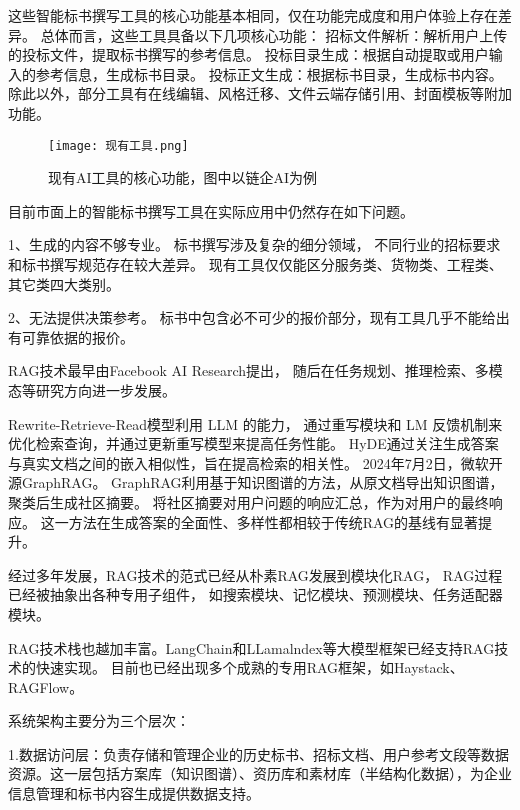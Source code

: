 \documentclass{xmu}
\begin{document}
这些智能标书撰写工具的核心功能基本相同，仅在功能完成度和用户体验上存在差异。
总体而言，这些工具具备以下几项核心功能：
招标文件解析：解析用户上传的投标文件，提取标书撰写的参考信息。
投标目录生成：根据自动提取或用户输入的参考信息，生成标书目录。
投标正文生成：根据标书目录，生成标书内容。
除此以外，部分工具有在线编辑、风格迁移、文件云端存储引用、封面模板等附加功能。

\begin{figure}[!htb]
    \centering
    \texttt{[image: 现有工具.png]}\\
    \caption{现有AI工具的核心功能，图中以链企AI为例}\label{xmulogo}
\end{figure}

目前市面上的智能标书撰写工具在实际应用中仍然存在如下问题。

1、生成的内容不够专业。
标书撰写涉及复杂的细分领域，
不同行业的招标要求和标书撰写规范存在较大差异。
现有工具仅仅能区分服务类、货物类、工程类、其它类四大类别。

2、无法提供决策参考。
标书中包含必不可少的报价部分，现有工具几乎不能给出有可靠依据的报价。

RAG技术最早由Facebook AI Research提出，
随后在任务规划、推理检索、多模态等研究方向进一步发展。

Rewrite-Retrieve-Read模型利用 LLM 的能力，
通过重写模块和 LM 反馈机制来优化检索查询，并通过更新重写模型来提高任务性能\cite{RRR}。
HyDE通过关注生成答案与真实文档之间的嵌入相似性，旨在提高检索的相关性\cite{HyDE}。
2024年7月2日，微软开源GraphRAG\cite{graphRAG}。
GraphRAG利用基于知识图谱的方法，从原文档导出知识图谱，聚类后生成社区摘要。
将社区摘要对用户问题的响应汇总，作为对用户的最终响应。
这一方法在生成答案的全面性、多样性都相较于传统RAG的基线有显著提升。

经过多年发展，RAG技术的范式已经从朴素RAG发展到模块化RAG，
RAG过程已经被抽象出各种专用子组件，
如搜索模块、记忆模块、预测模块、任务适配器模块。\cite{RAG}

RAG技术栈也越加丰富。LangChain和LLamalndex等大模型框架已经支持RAG技术的快速实现。
目前也已经出现多个成熟的专用RAG框架，如Haystack、RAGFlow。



系统架构主要分为三个层次：

1.数据访问层：负责存储和管理企业的历史标书、招标文档、用户参考文段等数据资源。这一层包括方案库（知识图谱）、资历库和素材库（半结构化数据），为企业信息管理和标书内容生成提供数据支持。
\end{document}
